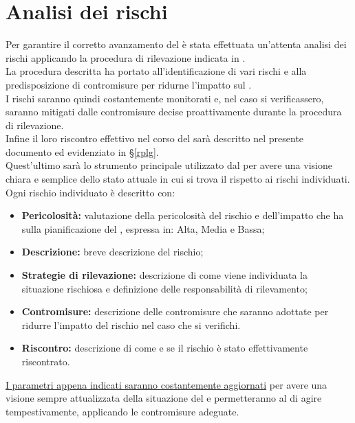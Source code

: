 \section{Analisi dei rischi}\label{adr}
Per garantire il corretto avanzamento del  è stata effettuata un'attenta analisi dei rischi applicando la  procedura di rilevazione indicata in \normeDiProgetto. \\
La procedura descritta ha portato all'identificazione di vari rischi e alla predisposizione di contromisure per ridurne l'impatto sul . \\
I rischi saranno quindi costantemente monitorati e, nel caso si verificassero, saranno mitigati dalle contromisure decise proattivamente durante la procedura di rilevazione.\\
Infine il loro riscontro effettivo nel corso del  sarà descritto nel presente documento ed evidenziato in §\ref{rplg}.\\ Quest'ultimo sarà lo strumento principale utilizzato dal \rRP per avere una visione chiara e semplice dello stato attuale in cui si trova il  rispetto ai rischi individuati. \\
Ogni rischio individuato è descritto con:
\begin{itemize}
\item \textbf{Pericolosità:} valutazione della pericolosità del rischio e dell'impatto che ha sulla pianificazione del , espressa in: Alta, Media e Bassa;
\item \textbf{Descrizione:} breve descrizione del rischio;
\item \textbf{Strategie di rilevazione:} descrizione di come viene individuata la situazione rischiosa e definizione delle responsabilità di rilevamento;
\item \textbf{Contromisure:} descrizione delle contromisure che saranno adottate per ridurre l'impatto del rischio nel caso che si verifichi.
\item \textbf{Riscontro:} descrizione di come e se il rischio è stato effettivamente riscontrato.
\end{itemize}
\uline{I parametri appena indicati saranno costantemente aggiornati} per avere una visione sempre attualizzata della situazione del  e permetteranno al \rRP di agire tempestivamente, applicando le contromisure adeguate.
